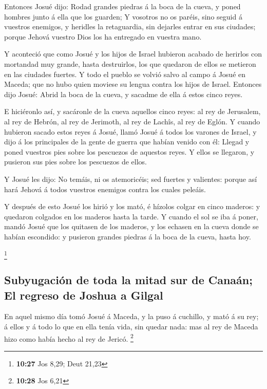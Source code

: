  Entonces Josué dijo: Rodad grandes piedras á la boca de la
cueva, y poned hombres junto á ella que los guarden;  Y
vosotros no os paréis, sino seguid á vuestros enemigos, y heridles la
retaguardia, sin dejarles entrar en sus ciudades; porque Jehová vuestro
Dios los ha entregado en vuestra mano.

 Y aconteció que como Josué y los hijos de Israel hubieron
acabado de herirlos con mortandad muy grande, hasta destruirlos, los que
quedaron de ellos se metieron en las ciudades fuertes.  Y
todo el pueblo se volvió salvo al campo á Josué en Maceda; que no hubo
quien moviese su lengua contra los hijos de Israel. 
Entonces dijo Josué: Abrid la boca de la cueva, y sacadme de ella á
estos cinco reyes.

 E hiciéronlo así, y sacáronle de la cueva aquellos cinco
reyes: al rey de Jerusalem, al rey de Hebrón, al rey de Jerimoth, al rey
de Lachîs, al rey de Eglón.  Y cuando hubieron sacado estos
reyes á Josué, llamó Josué á todos los varones de Israel, y dijo á los
principales de la gente de guerra que habían venido con él: Llegad y
poned vuestros pies sobre los pescuezos de aquestos reyes. Y ellos se
llegaron, y pusieron sus pies sobre los pescuezos de ellos.

 Y Josué les dijo: No temáis, ni os atemoricéis; sed
fuertes y valientes: porque así hará Jehová á todos vuestros enemigos
contra los cuales peleáis.

 Y después de esto Josué los hirió y los mató, é hízolos
colgar en cinco maderos: y quedaron colgados en los maderos hasta la
tarde.  Y cuando el sol se iba á poner, mandó Josué que los
quitasen de los maderos, y los echasen en la cueva donde se habían
escondido: y pusieron grandes piedras á la boca de la cueva, hasta hoy.

\footnote{\textbf{10:27} Jos 8,29; Deut 21,23}

\hypertarget{subyugaciuxf3n-de-toda-la-mitad-sur-de-canauxe1n-el-regreso-de-joshua-a-gilgal}{%
\subsection{Subyugación de toda la mitad sur de Canaán; El regreso de
Joshua a
Gilgal}\label{subyugaciuxf3n-de-toda-la-mitad-sur-de-canauxe1n-el-regreso-de-joshua-a-gilgal}}

 En aquel mismo día tomó Josué á Maceda, y la puso á
cuchillo, y mató á su rey; á ellos y á todo lo que en ella tenía vida,
sin quedar nada: mas al rey de Maceda hizo como había hecho al rey de
Jericó. \footnote{\textbf{10:28} Jos 6,21}

